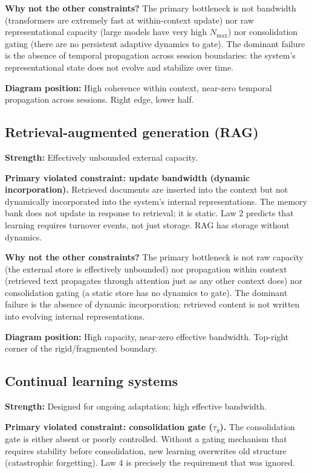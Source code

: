 \documentclass[12pt]{article}
\begin{document}
\textbf{Why not the other constraints?} The primary bottleneck is not bandwidth (transformers are extremely fast at within-context update) nor raw representational capacity (large models have very high $N_{\max}$) nor consolidation gating (there are no persistent adaptive dynamics to gate). The dominant failure is the absence of temporal propagation across session boundaries: the system's representational state does not evolve and stabilize over time.

\textbf{Diagram position:} High coherence within context, near-zero temporal propagation across sessions. Right edge, lower half.

\subsection{Retrieval-augmented generation (RAG)}

\textbf{Strength:} Effectively unbounded external capacity.

\textbf{Primary violated constraint: update bandwidth (dynamic incorporation).} Retrieved documents are inserted into the context but not dynamically incorporated into the system's internal representations. The memory bank does not update in response to retrieval; it is static. Law 2 predicts that learning requires turnover events, not just storage. RAG has storage without dynamics.

\textbf{Why not the other constraints?} The primary bottleneck is not raw capacity (the external store is effectively unbounded) nor propagation within context (retrieved text propagates through attention just as any other context does) nor consolidation gating (a static store has no dynamics to gate). The dominant failure is the absence of dynamic incorporation: retrieved content is not written into evolving internal representations.

\textbf{Diagram position:} High capacity, near-zero effective bandwidth. Top-right corner of the rigid/fragmented boundary.

\subsection{Continual learning systems}

\textbf{Strength:} Designed for ongoing adaptation; high effective bandwidth.

\textbf{Primary violated constraint: consolidation gate ($\tau_g$).} The consolidation gate is either absent or poorly controlled. Without a gating mechanism that requires stability before consolidation, new learning overwrites old structure (catastrophic forgetting). Law 4 is precisely the requirement that was ignored.
\end{document}
